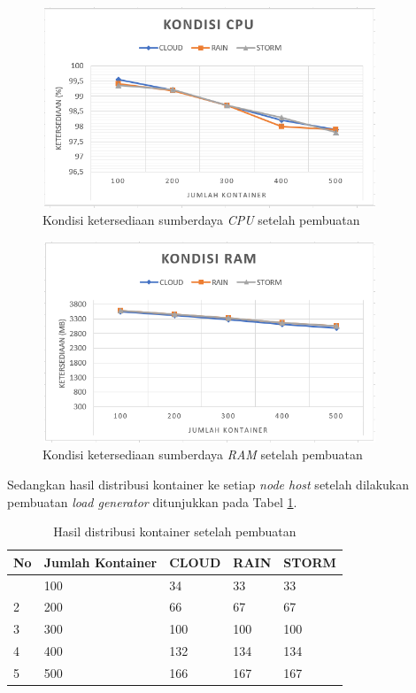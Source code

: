 				\begin{figure}[H]
					\centering
					\includegraphics[width=10cm,height=6cm]{Images/C-5/pembuatancpu.PNG}
					\caption{Kondisi ketersediaan sumberdaya \textit{CPU} setelah pembuatan}
					\label{pembuatancpu}
				\end{figure}
				
				\begin{figure}[H]
					\centering
					\includegraphics[width=10cm,height=6cm]{Images/C-5/pembuatanram.PNG}
					\caption{Kondisi ketersediaan sumberdaya \textit{RAM} setelah pembuatan}
					\label{pembuatanram}
				\end{figure}
				
				Sedangkan hasil distribusi kontainer ke setiap \textit{node host} setelah dilakukan pembuatan \textit{load generator} ditunjukkan pada Tabel \ref{jumlahkontainerpem}.
				\begin{longtable}{|p{}|p{}|p{0.15\textwidth}|p{}|p{}|}
					\caption{Hasil distribusi kontainer setelah pembuatan} \label{jumlahkontainerpem} \\
					\hline
					\textbf{No} & \textbf{Jumlah Kontainer} & \textbf{CLOUD} & \textbf{RAIN} & \textbf{STORM} \\ \hline
					\endhead
					\endfoot
					\endlastfoot
					1 & 100 & 34 & 33 & 33 \\ \hline
					2 & 200 & 66 & 67 & 67 \\ \hline
					3 & 300 & 100 & 100 & 100 \\ \hline
					4 & 400 & 132 & 134 & 134 \\ \hline
					5 & 500 & 166 & 167 & 167 \\ \hline
				\end{longtable}
			
